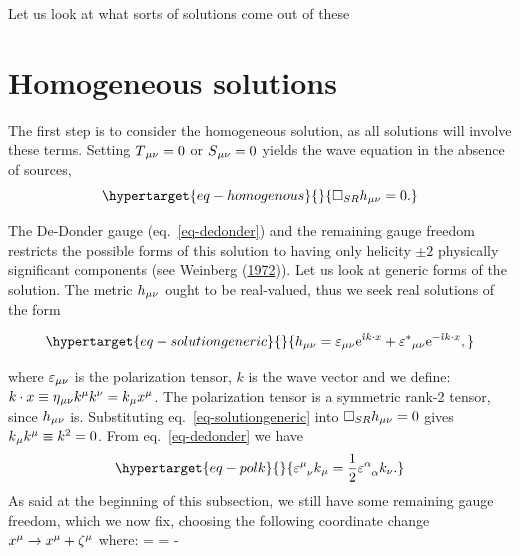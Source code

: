 \documentclass[
  11pt,
  a4paper,
  DIV=11,
  numbers=noendperiod,
  oneside]{scrreprt}
\let\[\relax \let\]\relax %
\DeclareRobustCommand{\[}{\begin{equation}}
\DeclareRobustCommand{\]}{\end{equation}}
\begin{document}
Let us look at what sorts of solutions come out of these

\hypertarget{homogeneous-solutions}{%
\section{Homogeneous solutions}\label{homogeneous-solutions}}

The first step is to consider the homogeneous solution, as all solutions
will involve these terms. Setting \(\SEco=0\) or \(\srcco=0\) yields the
wave equation in the absence of sources,
\begin{equation}\protect\hypertarget{eq-homogenous}{}{
   \SRDA \weakmet = 0 .
}\label{eq-homogenous}\end{equation}

The De-Donder gauge (eq.~\ref{eq-dedonder}) and the remaining gauge
freedom  restricts the
possible forms of this solution to having only helicity \(\pm2\)
physically significant components (see Weinberg
(\protect\hyperlink{ref-Weinberg:1972}{1972})). Let us look at generic
forms of the solution. The metric \(\weakmet\) ought to be real-valued,
thus we seek real solutions of the form

\begin{equation}\protect\hypertarget{eq-solutiongeneric}{}{
    \weakmet = \polco \exp{\im k\cdot x} + \conjpolco \exp{-\im k\cdot x},
}\label{eq-solutiongeneric}\end{equation}

where \(\polco\) is the polarization tensor, \(k\) is the wave vector
and we define:
\(k\cdot x\equiv \mink \ct{k} \ct[\nu]{k} = \co{k} \ct{x}\). The
polarization tensor is a symmetric rank-2 tensor, since \(\weakmet\) is.
Substituting eq.~\ref{eq-solutiongeneric} into \(\SRDA\weakmet=0\) gives
\(\co{k} \ct{k} \equiv k^2=0\).  From eq.~\ref{eq-dedonder} we have
\begin{equation}\protect\hypertarget{eq-polk}{}{
    \polmix \co{k} = \frac{1}{2}\trpol k_\nu.
}\label{eq-polk}\end{equation} As said at the beginning of this
subsection, we still have some remaining gauge freedom, which we now
fix, choosing the following coordinate change
\(\ct{x}\to\ct{x}+\ct{\zeta}\) where: \[
\ct{\zeta}=\im {}     =  - \im {} 
\]
\end{document}
